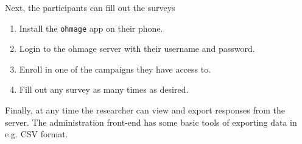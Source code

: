 \documentclass{scrartcl}
\begin{document}
\noindent Next, the participants can fill out the surveys

\begin{enumerate}
  \item Install the \texttt{ohmage} app on their phone.
  \item Login to the ohmage server with their username and password.
  \item Enroll in one of the campaigns they have access to.
  \item Fill out any survey as many times as desired.
\end{enumerate}

\noindent Finally, at any time the researcher can view and export responses from
the server. The administration front-end has some basic tools of exporting data
in e.g. CSV format.
\end{document}
